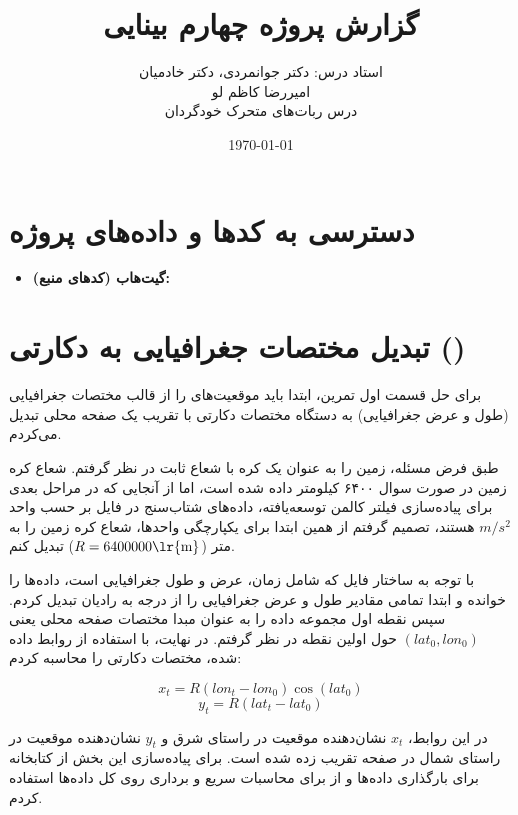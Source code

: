 \documentclass[12pt,a4paper]{article}
\title{گزارش پروژه چهارم بینایی \lr{GPS, IMU, EKF}}
\author{استاد درس:‌ دکتر جوانمردی، دکتر خادمیان \\ امیررضا کاظم لو \\ \small درس ربات‌های متحرک خودگردان \\}
\date{\today}
\begin{document}
	\maketitle
	


\section*{دسترسی به کدها و داده‌های پروژه}

\begin{itemize}
	\item \textbf{ گیت‌هاب (کدهای منبع):} \\
\end{itemize}
\vspace{0.5cm}

	
\section{تبدیل مختصات جغرافیایی به دکارتی ()}

برای حل قسمت اول تمرین، ابتدا باید موقعیت‌های  را از قالب مختصات جغرافیایی (طول و عرض جغرافیایی) به دستگاه مختصات دکارتی  با تقریب یک صفحه محلی تبدیل می‌کردم. 

طبق فرض مسئله، زمین را به عنوان یک کره با شعاع ثابت در نظر گرفتم. شعاع کره زمین در صورت سوال ۶۴۰۰ کیلومتر داده شده است، اما از آنجایی که در مراحل بعدی برای پیاده‌سازی فیلتر کالمن توسعه‌یافته، داده‌های شتاب‌سنج در فایل  بر حسب واحد $m/s^2$ هستند، تصمیم گرفتم از همین ابتدا برای یکپارچگی واحدها، شعاع کره زمین را به متر ($R=6400000\text{\lr{m}}$) تبدیل کنم. 

با توجه به ساختار فایل  که شامل زمان، عرض و طول جغرافیایی است، داده‌ها را خوانده و ابتدا تمامی مقادیر طول و عرض جغرافیایی را از درجه به رادیان تبدیل کردم. سپس نقطه اول مجموعه داده را به عنوان مبدا مختصات صفحه محلی یعنی $(lat_0, lon_0)$ حول اولین نقطه در نظر گرفتم. در نهایت، با استفاده از روابط داده شده، مختصات دکارتی را محاسبه کردم:

$$x_t=R(lon_t-lon_0)\cos(lat_0)$$
$$y_t=R(lat_t-lat_0)$$

در این روابط، $x_t$ نشان‌دهنده موقعیت در راستای شرق و $y_t$ نشان‌دهنده موقعیت در راستای شمال در صفحه تقریب زده شده است. برای پیاده‌سازی این بخش از کتابخانه  برای بارگذاری داده‌ها و از  برای محاسبات سریع و برداری روی کل داده‌ها استفاده کردم. 
\end{document}
